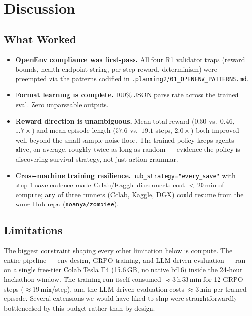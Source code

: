 \documentclass[11pt,a4paper]{article}
\begin{document}
\section{Discussion}
\label{sec:discussion}

\subsection{What Worked}
\begin{itemize}[leftmargin=*]
  \item \textbf{OpenEnv compliance was first-pass.} All four R1 validator traps
        (reward bounds, health endpoint string, per-step reward, determinism)
        were preempted via the patterns codified in
        \texttt{.planning2/01\_OPENENV\_PATTERNS.md}.
  \item \textbf{Format learning is complete.} 100\% JSON parse rate across the
        trained eval. Zero unparseable outputs.
  \item \textbf{Reward direction is unambiguous.} Mean total reward
        ($0.80$ vs.\ $0.46$, $1.7\!\times$) and mean episode length
        ($37.6$ vs.\ $19.1$ steps, $2.0\!\times$) both improved well beyond the
        small-sample noise floor. The trained policy keeps agents alive, on
        average, roughly twice as long as random --- evidence the policy is
        discovering survival strategy, not just action grammar.
  \item \textbf{Cross-machine training resilience.}
        \texttt{hub\_strategy="every\_save"} with step-1 save cadence made
        Colab/Kaggle disconnects cost $<$\,20\,min of compute; any of three
        runners (Colab, Kaggle, DGX) could resume from the same Hub repo
        (\texttt{noanya/zombiee}).
\end{itemize}

\subsection{Limitations}
\label{sec:limitations}

The biggest constraint shaping every other limitation below is compute. The
entire pipeline --- env design, GRPO training, and LLM-driven evaluation ---
ran on a single free-tier Colab Tesla T4 (15.6\,GB, no native bf16) inside
the 24-hour hackathon window. The training run itself consumed
$\approx$3\,h\,53\,min for 12 GRPO steps ($\approx$19\,min/step), and the
LLM-driven evaluation costs $\approx$3\,min per trained episode. Several
extensions we would have liked to ship were straightforwardly bottlenecked
by this budget rather than by design.
\end{document}
